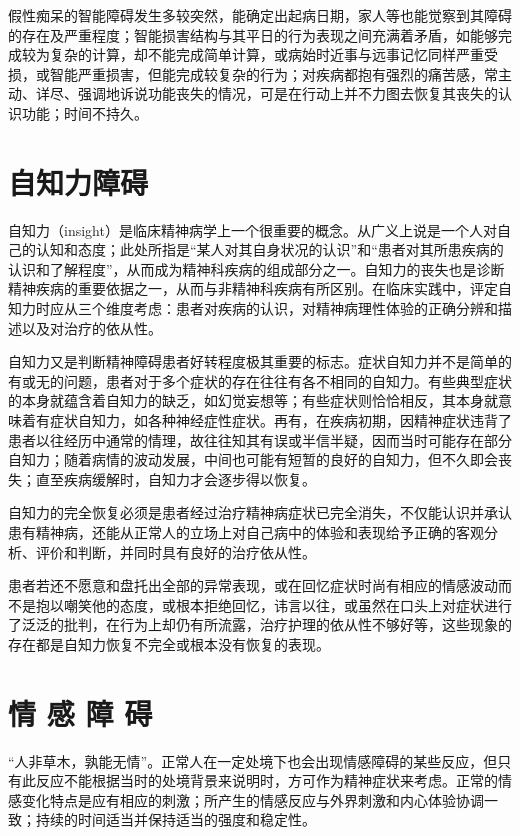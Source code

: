 假性痴呆的智能障碍发生多较突然，能确定出起病日期，家人等也能觉察到其障碍的存在及严重程度；智能损害结构与其平日的行为表现之间充满着矛盾，如能够完成较为复杂的计算，却不能完成简单计算，或病始时近事与远事记忆同样严重受损，或智能严重损害，但能完成较复杂的行为；对疾病都抱有强烈的痛苦感，常主动、详尽、强调地诉说功能丧失的情况，可是在行动上并不力图去恢复其丧失的认识功能；时间不持久。

\section{自知力障碍}

自知力（insight）是临床精神病学上一个很重要的概念。从广义上说是一个人对自己的认知和态度；此处所指是“某人对其自身状况的认识”和“患者对其所患疾病的认识和了解程度”，从而成为精神科疾病的组成部分之一。自知力的丧失也是诊断精神疾病的重要依据之一，从而与非精神科疾病有所区别。在临床实践中，评定自知力时应从三个维度考虑：患者对疾病的认识，对精神病理性体验的正确分辨和描述以及对治疗的依从性。

自知力又是判断精神障碍患者好转程度极其重要的标志。症状自知力并不是简单的有或无的问题，患者对于多个症状的存在往往有各不相同的自知力。有些典型症状的本身就蕴含着自知力的缺乏，如幻觉妄想等；有些症状则恰恰相反，其本身就意味着有症状自知力，如各种神经症性症状。再有，在疾病初期，因精神症状违背了患者以往经历中通常的情理，故往往知其有误或半信半疑，因而当时可能存在部分自知力；随着病情的波动发展，中间也可能有短暂的良好的自知力，但不久即会丧失；直至疾病缓解时，自知力才会逐步得以恢复。

自知力的完全恢复必须是患者经过治疗精神病症状已完全消失，不仅能认识并承认患有精神病，还能从正常人的立场上对自己病中的体验和表现给予正确的客观分析、评价和判断，并同时具有良好的治疗依从性。

患者若还不愿意和盘托出全部的异常表现，或在回忆症状时尚有相应的情感波动而不是抱以嘲笑他的态度，或根本拒绝回忆，讳言以往，或虽然在口头上对症状进行了泛泛的批判，在行为上却仍有所流露，治疗护理的依从性不够好等，这些现象的存在都是自知力恢复不完全或根本没有恢复的表现。

\section{情 感 障 碍}

“人非草木，孰能无情”。正常人在一定处境下也会出现情感障碍的某些反应，但只有此反应不能根据当时的处境背景来说明时，方可作为精神症状来考虑。正常的情感变化特点是应有相应的刺激；所产生的情感反应与外界刺激和内心体验协调一致；持续的时间适当并保持适当的强度和稳定性。


